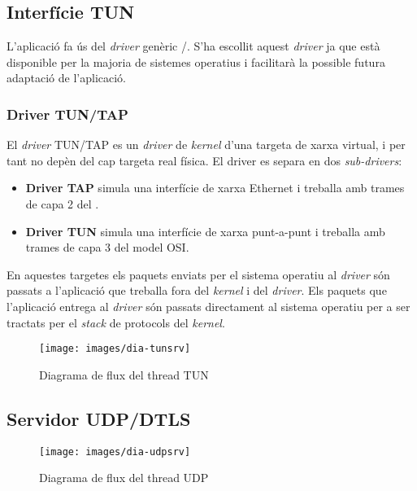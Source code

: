 \subsection{Interfície TUN}
L'aplicació fa ús del \emph{driver} genèric /. S'ha escollit aquest \emph{driver} ja que està disponible per la majoria de sistemes operatius i facilitarà la possible futura adaptació de l'aplicació.

\subsubsection{Driver TUN/TAP}
El \emph{driver} TUN/TAP es un \emph{driver} de \emph{kernel} d'una targeta de xarxa virtual, i per tant no depèn del cap targeta real física. El driver es separa en dos \emph{sub-drivers}:
\begin{itemize}
\item \textbf{Driver TAP} simula una interfície de xarxa Ethernet i treballa amb trames de capa 2 del .
\item \textbf{Driver TUN} simula una interfície de xarxa punt-a-punt i treballa amb trames de capa 3 del model OSI.
\end{itemize}

En aquestes targetes els paquets enviats per el sistema operatiu al \emph{driver} són passats a l'aplicació que treballa fora del \emph{kernel} i del \emph{driver}. Els paquets que l'aplicació entrega al \emph{driver} són passats directament al sistema operatiu per a ser tractats per el \emph{stack} de protocols del \emph{kernel}.

\begin{figure}[htb]
\centering
\texttt{[image: images/dia-tunsrv]}
\caption{Diagrama de flux del thread TUN}
\label{F:dia-tunsrv}
\end{figure}
\clearpage%
\subsection{Servidor UDP/DTLS}
\begin{figure}[htb]
\centering
\texttt{[image: images/dia-udpsrv]}
\caption{Diagrama de flux del thread UDP}
\label{F:dia-udpsrv}
\end{figure}
